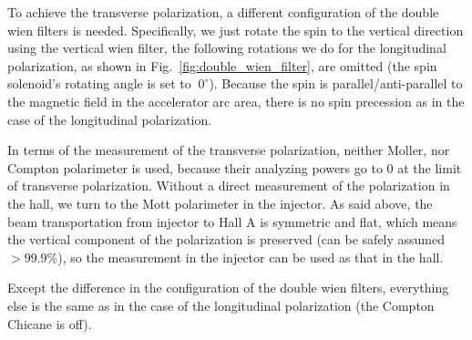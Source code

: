 To achieve the transverse polarization, a different configuration of the double 
wien filters is needed. Specifically, we just rotate the spin to the vertical 
direction using the vertical wien filter, the 
following rotations we do for the longitudinal polarization, as shown in 
Fig.~\ref{fig:double_wien_filter}, are omitted (the spin solenoid's rotating
angle is set to $~0^\circ$). Because the spin is parallel/anti-parallel
to the magnetic field in the accelerator arc area, there is no spin precession as in
the case of the longitudinal polarization. 

In terms of the measurement of the transverse polarization, neither Moller, nor Compton
polarimeter is used, because their analyzing powers go to 0 at the limit of transverse
polarization. Without a direct measurement of the polarization in the hall, 
we turn to the Mott polarimeter in the injector. 
As said above, the beam transportation from injector to Hall A
is symmetric and flat, which means the vertical component of the polarization
is preserved (can be safely assumed $>99.9\%$), so the measurement in the
injector can be used as that in the hall.

Except the difference in the configuration of the double wien filters, everything 
else is the same as in the case of the longitudinal polarization (the Compton Chicane
is off). 

